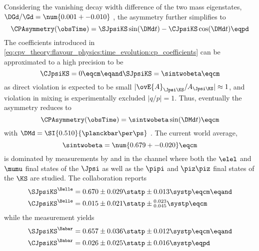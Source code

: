 Considering the vanishing decay width difference of the two mass eigenstates,
$\DGd/\Gd = \num{0.001 +- 0.010}$ \cite{Amhis:2014hma}, the \CP asymmetry
further simplifies to
%
\begin{equation}\label{eq:cpv_theory:bd2jpsiks:cp_asymmetry:simplified}
  \CPAsymmetry(\obsTime) = \SJpsiKS\sin(\DMd t) - \CJpsiKS\cos(\DMd t) \eqpd
\end{equation}
%
The \CP coefficients introduced in
\cref{eq:cpv_theory:flavour_physics:time_evolution:cp_coefficients} can be
approximated to a high precision to be
%
\begin{equation}
  \CJpsiKS = 0           \eqcm\eqand 
  \SJpsiKS = \sintwobeta \eqcm
\end{equation}
%
as direct \CP violation is expected to be small
$\vert\ovE{A}_{\Jpsi\KS}/A_{\Jpsi\KS}\vert\approx 1$, and \CP violation in
mixing is experimentally excluded $\vert q/p \vert = 1$. Thus, eventually the
\CP asymmetry reduces to
%
\begin{equation}
  \CPAsymmetry(\obsTime) = \sintwobeta\sin(\DMd t) \eqcm
\end{equation}
%
with $\DMd = \SI{0.510}{\planckbar\per\ps}$ \cite{Agashe:2014kda}.
The current world average, \cite{Amhis:2014hma}
%
\begin{equation*}
  \sintwobeta = \num{0.679 +- 0.020} \eqcm
\end{equation*}
%
is dominated by measurements by \Babar and \Belle in the \BdToJpsiKS channel
where both the $\elel$ and $\mumu$ final states of the $\Jpsi$ as well as the
$\pipi$ and $\piz\piz$ final states of the $\KS$ are studied. The \Belle
collaboration \cite{Adachi:2012et} reports
%
\begin{equation*}
  \begin{split}
    \SJpsiKS^{\text{\Belle}} &= 0.670 \pm 0.029 \statp \pm 0.013 \systp              \eqcm\eqand \\
    \CJpsiKS^{\text{\Belle}} &= 0.015 \pm 0.021 \statp \pm {}_{0.045}^{0.023} \systp \eqcm
  \end{split}
\end{equation*}
%
while the \Babar measurement \cite{Aubert:2009aw} yields
%
\begin{equation*}
  \begin{split}
    \SJpsiKS^{\text{\Babar}} &= 0.657 \pm 0.036 \statp \pm 0.012 \systp \eqcm\eqand \\
    \CJpsiKS^{\text{\Babar}} &= 0.026 \pm 0.025 \statp \pm 0.016 \systp \eqpd
  \end{split}
\end{equation*}
